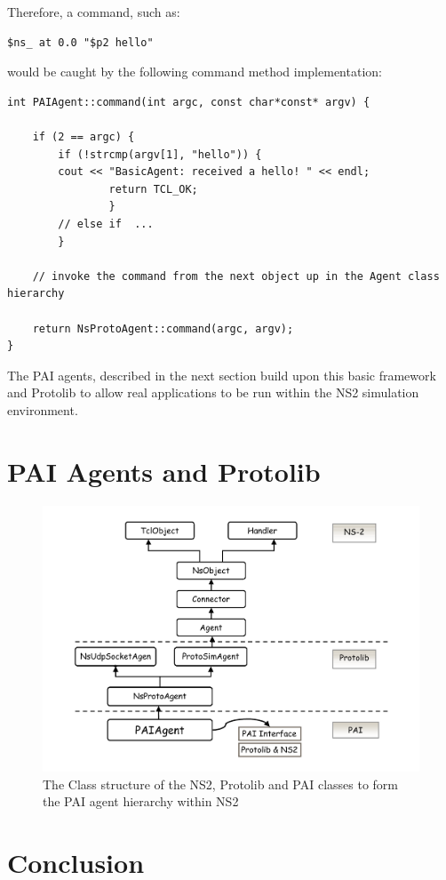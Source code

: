 Therefore, a command, such as:

\footnotesize
\begin{verbatim}
$ns_ at 0.0 "$p2 hello"
\end{verbatim}
\normalsize

\noindent would be caught by the following command method implementation:


\footnotesize
\begin{verbatim}
int PAIAgent::command(int argc, const char*const* argv) {

    if (2 == argc) {
        if (!strcmp(argv[1], "hello")) {
		cout << "BasicAgent: received a hello! " << endl;
                return TCL_OK;			
                }
        // else if  ... 
        }

    // invoke the command from the next object up in the Agent class hierarchy
    
    return NsProtoAgent::command(argc, argv);
}	
\end{verbatim}
\normalsize

The PAI agents, described in the next section build upon this basic 
framework and Protolib to allow real applications to be run within the
NS2 simulation environment. 
  
\section{PAI Agents and Protolib}

\begin{figure}
\centering
\includegraphics[scale=0.4]{images/paiAgentsClassHeirarch}
\caption{The Class structure of the NS2, Protolib and PAI classes to form the 
PAI agent hierarchy within NS2} 
\label{jni:fig:paiAgentsClassHeirarch}
\end{figure}

\section{Conclusion}

